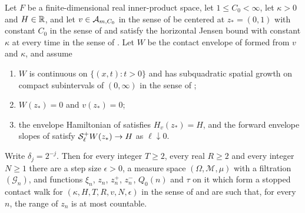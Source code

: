 \begin{lemma}
Let $F$ be a finite-dimensional real inner-product space, let
$1\le C_0<\infty$, let $\kappa>0$ and $H\in\mathbb{R}$, and let
$v\in\mathcal{A}_{m,C_0}$ in the sense of  be centered at
$z_*=(0,1)$ with constant $C_0$ in the sense of  and
satisfy the horizontal Jensen bound with constant $\kappa$ at every time in the
sense of . Let $W$ be the contact envelope of
 formed from $v$ and $\kappa$, and assume
\begin{enumerate}
\item $W$ is continuous on $\{(x,t):t>0\}$ and has subquadratic spatial growth on
compact subintervals of $(0,\infty)$ in the sense of
;
\item $W(z_*)=0$ and $v(z_*)=0$;
\item the envelope Hamiltonian of  satisfies
$H_v(z_*)=H$, and the forward envelope slopes of  satisfy
$\mathcal{S}^+_\ell W(z_*)\to H$ as $\ell\downarrow0$.
\end{enumerate}
Write $\delta_j=2^{-j}$. Then for every integer $T\ge2$, every real $R\ge2$ and
every integer $N\ge1$ there are a step size $\epsilon>0$, a measure space
$(\Omega,\mathcal M,\mu)$ with a filtration $(\mathcal G_n)$, and functions
$\xi_n$, $z_n$, $z^+_n$, $z^-_n$, $Q_0(n)$ and $\tau$ on it which form a stopped
contact walk for $(\kappa,H,T,R,v,N,\epsilon)$ in the sense of
 and are such that, for every $n$, the range of $z_n$ is
at most countable.
\end{lemma}
